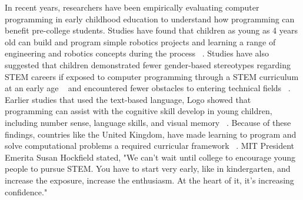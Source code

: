\documentclass[11pt, letterpaper, onecolumn]{article}
\begin{document}
%
In recent years, researchers have been empirically evaluating computer programming in early childhood education to understand how programming can benefit pre-college students. 
%
Studies have found that children as young as 4 years old can build and program simple robotics projects and learning a range of engineering and robotics concepts during the process ~\cite{bers2002itcea, cejka2006ijee,perlman1976mit,wyeth2008jls, sullivan2013jite,sullivan2015ijde}. 
%
Studies have also suggested that children demonstrated fewer gender-based stereotypes regarding STEM careers if exposed to computer programming through a STEM curriculum at an early age  ~\cite{metz2007,steele1997americanpsych} and encountered fewer obstacles to entering technical fields ~\cite{madill2007, markert1996jtechs}. 
%
Earlier studies that used the text-based language, Logo showed that programming can assist with the cognitive skill develop in young children, including number sense, language skills, and visual memory
~\cite{clements1999}. 
%
Because of these findings, countries like the United Kingdom, have made learning to program and solve computational problems a required curricular framework ~\cite{uk2014natlcurriculum}.
%
MIT President Emerita Susan Hockfield stated, "We can't wait until college to encourage young people to pursue STEM. You have to start very early, like in kindergarten, and increase the exposure, increase the enthusiasm. At the heart of it, it's increasing confidence." ~\cite{zazulia2016usnews}
\end{document}
